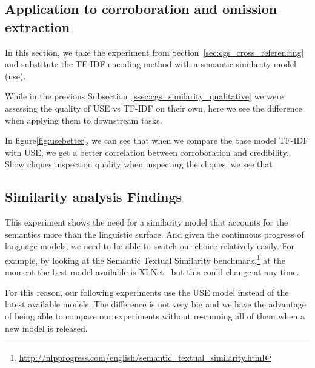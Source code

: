 
\subsection{\statusred Application to corroboration and omission extraction}
\label{ssec:cgs_similarity_cliques}


In this section, we take the experiment from Section~\ref{sec:cgs_cross_referencing} and substitute the TF-IDF encoding method with a semantic similarity model (\acrshort{use}).

While in the previous Subsection~\ref{ssec:cgs_similarity_qualitative} we were assessing the quality of USE vs TF-IDF on their own, here we see the difference when applying them to downstream tasks.



In figure\ref{fig:usebetter}, we can see that when we compare the base model TF-IDF with USE, we get a better correlation between corroboration and credibility.
Show cliques inspection quality
when inspecting the cliques, we see that 



\subsection{\statusgreen Similarity analysis Findings}
\label{ssec:cgs_similarity_conclusion}

This experiment shows the need for a similarity model that accounts for the semantics more than the linguistic surface. And given the continuous progress of language models, we need to be able to switch our choice relatively easily.
For example, by looking at the Semantic Textual Similarity benchmark,\footnote{\url{http://nlpprogress.com/english/semantic_textual_similarity.html}} at the moment the best model available is XLNet~\citep{yang2019xlnet} but this could change at any time.

For this reason, our following experiments use the USE model instead of the latest available models. The difference is not very big and we have the advantage of being able to compare our experiments without re-running all of them when a new model is released.

